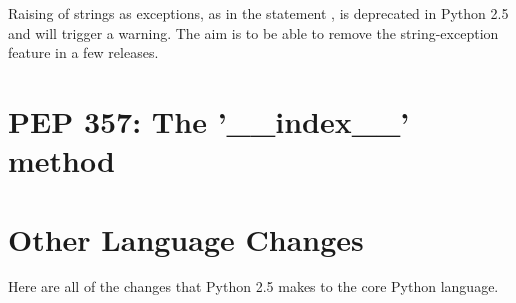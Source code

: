 \documentclass{howto}
\begin{document}
Raising of strings as exceptions, as in the statement , is deprecated in Python 2.5 and will trigger a
warning.  The aim is to be able to remove the string-exception feature
in a few releases.


\begin{seealso}


\end{seealso}


\section{PEP 357: The '__index__' method}



\section{Other Language Changes}

Here are all of the changes that Python 2.5 makes to the core Python
language.
\end{document}
